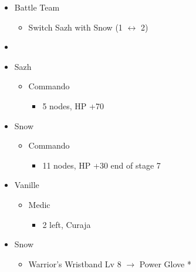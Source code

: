 \begin{menu}
\begin{itemize}
    \paradigm
    \begin{itemize}
        \item Battle Team
        \begin{itemize}
            \item Switch Sazh with Snow (1 $\leftrightarrow$ 2)
        \end{itemize}
        \item {}%
{\paradigmline{(\rav)}{\com}{\com}}%
{\paradigmline[2]{\textit{\com}}{\textit{\com}}{\textit{\com}}}%
{\paradigmline{(\rav)}{\sen}{(\rav)}}%
{\paradigmline{(\com)}{(\sen)}{\med}}%
{\paradigmline{\rav}{(\com)}{(\rav)}}%
{\paradigmline{\rav}{\rav}{\rav}}
    \end{itemize}
    \crystarium
    \begin{itemize}
        \item Sazh
        \begin{itemize}
            \item Commando
            \begin{itemize}
                \item 5 nodes, HP +70
            \end{itemize}
        \end{itemize}
        \item Snow
        \begin{itemize}
            \item Commando
            \begin{itemize}
                \item 11 nodes, HP +30 end of stage 7
            \end{itemize}
        \end{itemize}
        \item Vanille
        \begin{itemize}
            \item Medic
            \begin{itemize}
                \item 2 left, Curaja
            \end{itemize}
        \end{itemize}
    \end{itemize}
    \equip
    \begin{itemize}
        \item Snow
        \begin{itemize}
            \item Warrior's Wristband Lv 8 $\rightarrow$ Power Glove *
        \end{itemize}
    \end{itemize}
\end{itemize}
\end{menu}
